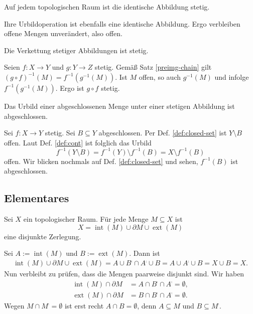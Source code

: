 \begin{Satz}
Auf jedem topologischen Raum ist die identische Abbildung stetig.
\end{Satz}
\begin{Beweis}
Ihre Urbildoperation ist ebenfalls eine identische Abbildung. Ergo
verbleiben offene Mengen unverändert, also offen.\,\qedsymbol
\end{Beweis}

\begin{Satz}
Die Verkettung stetiger Abbildungen ist stetig.
\end{Satz}
\begin{Beweis}
Seien $f\colon X\to Y$ und $g\colon Y\to Z$ stetig.
Gemäß Satz \ref{preimg-chain} gilt $(g\circ f)^{-1}(M)=f^{-1}(g^{-1}(M))$.
Ist $M$ offen, so auch $g^{-1}(M)$ und infolge $f^{-1}(g^{-1}(M))$.
Ergo ist $g\circ f$ stetig.\,\qedsymbol
\end{Beweis}

\begin{Satz}\label{cont-implies-closed-closed}
Das Urbild einer abgeschlossenen Menge unter einer stetigen Abbildung
ist abgeschlossen.
\end{Satz}
\begin{Beweis}
Sei $f\colon X\to Y$ stetig. Sei $B\subseteq Y$ abgeschlossen.
Per Def. \ref{def:closed-set} ist $Y\setminus B$ offen. Laut Def.
\ref{def:cont} ist folglich das Urbild
\[f^{-1}(Y\setminus B) = f^{-1}(Y)\setminus f^{-1}(B) = X\setminus f^{-1}(B)\]
offen. Wir blicken nochmals auf Def. \ref{def:closed-set} und sehen,
$f^{-1}(B)$ ist abgeschlossen.\,\qedsymbol
\end{Beweis}

\newpage
\subsection{Elementares}

\begin{Satz}\label{partition-int-bd-ext}
Sei $X$ ein topologischer Raum. Für jede Menge $M\subseteq X$ ist%
\[X = \operatorname{int}(M)\cup\partial M\cup\operatorname{ext}(M)\]
eine disjunkte Zerlegung.
\end{Satz}
\begin{Beweis} Sei $A:=\operatorname{int}(M)$ und $B:=\operatorname{ext}(M)$. Dann ist
\begin{gather*}
\operatorname{int}(M)\cup\partial M\cup\operatorname{ext}(M)
= A\cup B^\comp\cap A^\comp\cup B
= A\cup A^\comp\cup B = X\cup B = X.
\end{gather*}
Nun verbleibt zu prüfen, dass die Mengen paarweise disjunkt sind. Wir haben%
\begin{align*}
\operatorname{int}(M)\cap\partial M &= A\cap B^\comp\cap A^\comp = \emptyset,\\
\operatorname{ext}(M)\cap\partial M &= B\cap B^\comp\cap A^\comp = \emptyset.
\end{align*}
Wegen $M\cap M^\comp=\emptyset$ ist erst recht $A\cap B=\emptyset$,
denn $A\subseteq M$ und $B\subseteq M^\comp$.\,\qedsymbol
\end{Beweis}


